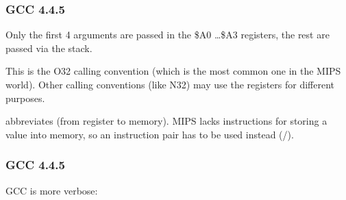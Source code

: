 \subsubsection{\Optimizing GCC 4.4.5}

Only the first 4 arguments are passed in the \$A0 \dots \$A3 registers, the rest are passed via the stack.

This is the O32 calling convention (which is the most common one in the MIPS world).
Other calling conventions (like N32) may use the registers for different purposes.


 abbreviates  (from register to memory).
MIPS lacks instructions for storing a value into memory, so an instruction pair has to be used instead (/).





\subsubsection{\NonOptimizing GCC 4.4.5}

\NonOptimizing GCC is more verbose:





